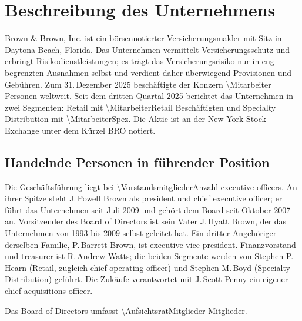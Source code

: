 \section{Beschreibung des Unternehmens}

Brown \& Brown, Inc. ist ein b\"orsennotierter Versicherungsmakler mit Sitz in
Daytona Beach, Florida. Das Unternehmen vermittelt Versicherungsschutz und
erbringt Risikodienstleistungen; es tr\"agt das Versicherungsrisiko nur in
eng begrenzten Ausnahmen selbst und verdient daher \"uberwiegend Provisionen
und Geb\"uhren. Zum 31.\,Dezember 2025 besch\"aftigte der Konzern
\num{\Mitarbeiter} Personen weltweit.
Seit dem dritten Quartal 2025 berichtet das Unternehmen in zwei Segmenten:
Retail mit \num{\MitarbeiterRetail} Besch\"aftigten und
Specialty Distribution mit \num{\MitarbeiterSpez}.
Die Aktie ist an der New York Stock Exchange unter dem K\"urzel BRO
notiert.

\subsection{Handelnde Personen in f\"uhrender Position}

Die Gesch\"aftsf\"uhrung liegt bei \num{\VorstandsmitgliederAnzahl}
executive officers. An ihrer Spitze
steht J.\,Powell Brown als president und chief executive officer; er f\"uhrt
das Unternehmen seit Juli 2009 und geh\"ort dem Board seit Oktober 2007 an.
Vorsitzender des Board of Directors ist sein Vater J.\,Hyatt Brown, der das
Unternehmen von 1993 bis 2009 selbst geleitet hat. Ein dritter Angeh\"origer
derselben Familie, P.\,Barrett Brown, ist executive vice
president. Finanzvorstand und treasurer ist
R.\,Andrew Watts; die beiden Segmente werden von Stephen P.\,Hearn (Retail,
zugleich chief operating officer) und Stephen M.\,Boyd (Specialty
Distribution) gef\"uhrt. Die Zuk\"aufe verantwortet mit J.\,Scott Penny ein
eigener chief acquisitions officer.

Das Board of Directors umfasst \num{\AufsichtsratMitglieder}
Mitglieder.

